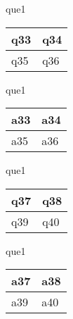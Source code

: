 \documentclass[13.5pt, varwidth=true]{beamer}
\begin{document}
\begin{frame}[shrink=19,fragile]
	\begin{beamercolorbox}[rounded=true, left, shadow=true,wd=14.8cm]{que1}
		\begin{tabular}{p{7cm} | p{7cm}}
			\parbox{7cm}{q33 } & \parbox{7cm}{q34 } \\ 
			\hline
			\parbox{7cm}{q35 } & \parbox{7cm}{q36 } \\
		\end{tabular}
	\end{beamercolorbox}
\end{frame}
\begin{frame}[shrink=19,fragile]
	\begin{beamercolorbox}[rounded=true, left, shadow=true,wd=14.8cm]{que1}
		\begin{tabular}{p{7cm} | p{7cm}}
			\textcolor{ared}{a33 }  & \textcolor{ared}{a34 } \\ 
			\hline
			\textcolor{ared}{a35 }  & \textcolor{ared}{a36 } \\
		\end{tabular}
	\end{beamercolorbox}
\end{frame}

\begin{frame}[shrink=19,fragile]
	\begin{beamercolorbox}[rounded=true, left, shadow=true,wd=14.8cm]{que1}
		\begin{tabular}{p{7cm} | p{7cm}}
			\parbox{7cm}{q37 } & \parbox{7cm}{q38 } \\ 
			\hline
			\parbox{7cm}{q39 } & \parbox{7cm}{q40 } \\
		\end{tabular}
	\end{beamercolorbox}
\end{frame}
\begin{frame}[shrink=19,fragile]
	\begin{beamercolorbox}[rounded=true, left, shadow=true,wd=14.8cm]{que1}
		\begin{tabular}{p{7cm} | p{7cm}}
			\textcolor{ared}{a37 }  & \textcolor{ared}{a38 } \\ 
			\hline
			\textcolor{ared}{a39 }  & \textcolor{ared}{a40 } \\
		\end{tabular}
	\end{beamercolorbox}
\end{frame}
\end{document}
